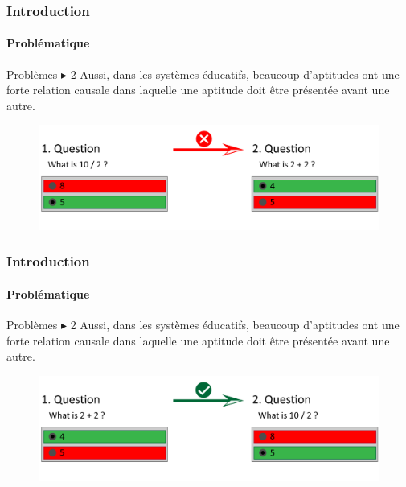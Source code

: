 \documentclass[aspectratio=169,professionalfonts, 12pt]{beamer}
\begin{document}
\begin{frame}
  \frametitle{Introduction}
  \framesubtitle{Problématique}
  \begin{minipage}{\textwidth}
    \begin{alertblock}{Problèmes \(\displaystyle \blacktriangleright \) 2}
      Aussi, dans les systèmes éducatifs, beaucoup d’aptitudes ont une forte relation causale dans laquelle une aptitude doit être présentée avant une autre.
    \end{alertblock}
  \end{minipage}

  \begin{minipage}{\textwidth}
    \begin{figure}[t]
    \begin{center}
      \includegraphics[width=\textwidth]{images/etat_art/hierarchi_competence2.png}
    \end{center}
    \end{figure} 
  \end{minipage}
\end{frame}

\begin{frame}
  \frametitle{Introduction}
  \framesubtitle{Problématique}
  \begin{minipage}{\textwidth}
    \begin{alertblock}{Problèmes \(\displaystyle \blacktriangleright \) 2}
      Aussi, dans les systèmes éducatifs, beaucoup d’aptitudes ont une forte relation causale dans laquelle une aptitude doit être présentée avant une autre.
    \end{alertblock}
  \end{minipage}

  \begin{minipage}{\textwidth}
    \begin{figure}[t]
    \begin{center}
      \includegraphics[width=\textwidth]{images/etat_art/hierarchi_competence.png}
    \end{center}
    \end{figure} 
  \end{minipage}
\end{frame}
\end{document}
